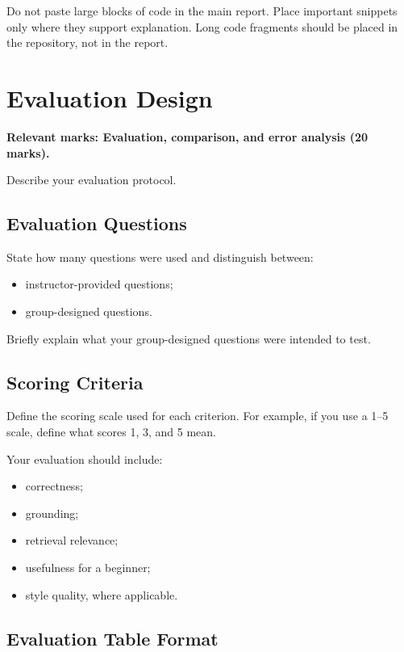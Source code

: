 \documentclass[10pt,conference]{IEEEtran}
\begin{document}
Do not paste large blocks of code in the main report. 
Place important snippets only where they support explanation. 
Long code fragments should be placed in the repository, not in the report.

\section{Evaluation Design}
\label{sec:evaluation-design}

\textbf{Relevant marks: Evaluation, comparison, and error analysis (20 marks).}

Describe your evaluation protocol.

\subsection{Evaluation Questions}

State how many questions were used and distinguish between:

\begin{itemize}
    \item instructor-provided questions;
    \item group-designed questions.
\end{itemize}

Briefly explain what your group-designed questions were intended to test.

\subsection{Scoring Criteria}

Define the scoring scale used for each criterion. 
For example, if you use a 1--5 scale, define what scores 1, 3, and 5 mean.

Your evaluation should include:

\begin{itemize}
    \item correctness;
    \item grounding;
    \item retrieval relevance;
    \item usefulness for a beginner;
    \item style quality, where applicable.
\end{itemize}

\subsection{Evaluation Table Format}
\end{document}
